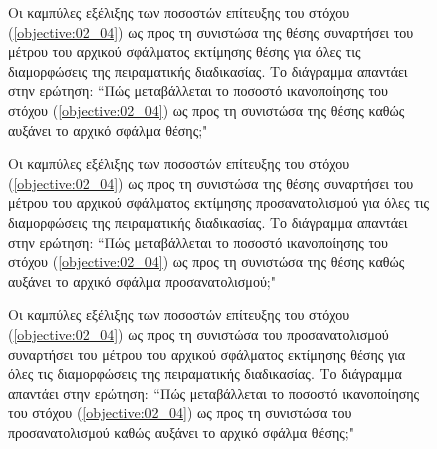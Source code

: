 \begin{figure}\centering
  \vspace{2cm}
  
  \vspace{1.5cm}
  \caption{\small Οι καμπύλες εξέλιξης των ποσοστών επίτευξης του στόχου
           (\ref{objective:02_04}) ως προς τη συνιστώσα της θέσης συναρτήσει
           του μέτρου του αρχικού σφάλματος εκτίμησης θέσης για όλες τις
           διαμορφώσεις της πειραματικής διαδικασίας.  Το διάγραμμα απαντάει
           στην ερώτηση: ``Πώς μεταβάλλεται το ποσοστό ικανοποίησης του στόχου
           (\ref{objective:02_04}) ως προς τη συνιστώσα της θέσης καθώς αυξάνει
           το αρχικό σφάλμα θέσης;"}
  \label{fig:02_04_05:11}
\end{figure}


\begin{figure}\centering
  \vspace{2cm}
  
  \vspace{1.5cm}
  \caption{\small Οι καμπύλες εξέλιξης των ποσοστών επίτευξης του στόχου
           (\ref{objective:02_04}) ως προς τη συνιστώσα της θέσης συναρτήσει
           του μέτρου του αρχικού σφάλματος εκτίμησης προσανατολισμού για όλες
           τις διαμορφώσεις της πειραματικής διαδικασίας. Το διάγραμμα απαντάει
           στην ερώτηση: ``Πώς μεταβάλλεται το ποσοστό ικανοποίησης του στόχου
           (\ref{objective:02_04}) ως προς τη συνιστώσα της θέσης καθώς αυξάνει
           το αρχικό σφάλμα προσανατολισμού;"}
  \label{fig:02_04_05:12}
\end{figure}


\begin{figure}\centering
  \vspace{2cm}
  
  \vspace{1.5cm}
  \caption{\small Οι καμπύλες εξέλιξης των ποσοστών επίτευξης του στόχου
           (\ref{objective:02_04}) ως προς τη συνιστώσα του προσανατολισμού
           συναρτήσει του μέτρου του αρχικού σφάλματος εκτίμησης θέσης για όλες
           τις διαμορφώσεις της πειραματικής διαδικασίας. Το διάγραμμα απαντάει
           στην ερώτηση: ``Πώς μεταβάλλεται το ποσοστό ικανοποίησης του στόχου
           (\ref{objective:02_04}) ως προς τη συνιστώσα του προσανατολισμού
           καθώς αυξάνει το αρχικό σφάλμα θέσης;"}
  \label{fig:02_04_05:13}
\end{figure}



